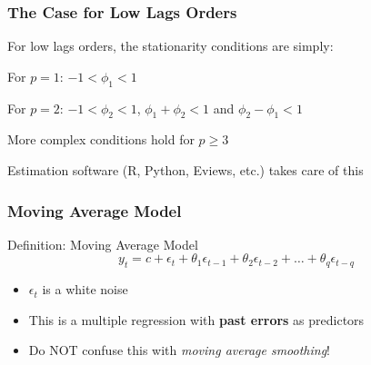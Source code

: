 \documentclass{beamer}
\newenvironment{wideitemize}{\itemize\addtolength{\itemsep}{10pt}}{\enditemize}
\begin{document}
\begin{frame}
  \frametitle{The Case for Low Lags Orders}

  For low lags orders, the stationarity conditions are simply:\\
  
  \begin{wideitemize}
  \item For $p=1$: $-1 < \phi_1 < 1$
  \item For $p=2$:  $-1 < \phi_2 < 1$, $ \phi_1 + \phi_2 < 1$ and $ \phi_2 - \phi_1 < 1$
  \item More complex conditions hold for $p \geq 3$
  \item Estimation software (R, Python, Eviews, etc.) takes care of this
  \end{wideitemize}
  
\end{frame}



\begin{frame}
  \frametitle{Moving Average Model}
  \begin{block}{Definition: Moving Average Model}
    \begin{equation*}
      y_t = c + \epsilon_t + \theta_1 \epsilon_{t-1} + \theta_2 \epsilon_{t-2} + \dots + \theta_q \epsilon_{t-q}
    \end{equation*}
    \begin{itemize}
    \item $\epsilon_t$ is a white noise
    \item This is a multiple regression with \textbf{past errors} as predictors
    \item Do NOT confuse this with \emph{moving average smoothing}!
    \end{itemize}    
  \end{block}

\end{frame}
\end{document}
